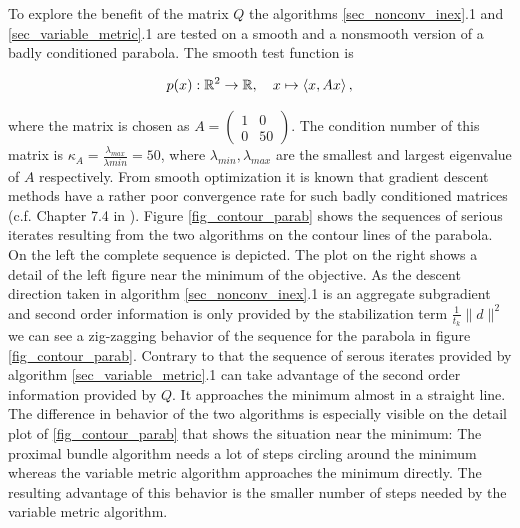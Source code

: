To explore the benefit of the matrix \(Q\) the algorithms \ref{sec_nonconv_inex}.1 and \ref{sec_variable_metric}.1 are tested on a smooth and a nonsmooth version of a badly conditioned parabola.
The smooth test function is

\[p(x): \mathbb{R}^2 \to \mathbb{R}, \quad x \mapsto \left\langle x, Ax \right\rangle,\]

where the matrix is chosen as \(A = \begin{pmatrix} 1&0 \\ 0&50\end{pmatrix}\). The condition number of this matrix is \(\kappa_A = \frac{\lambda_{max}}{\lambda{min}} = 50\), where \(\lambda_{min}, \lambda_{max}\) are the smallest and largest eigenvalue of \(A\) respectively. From smooth optimization it is known that gradient descent methods have a rather poor convergence rate for such badly conditioned matrices (c.f. Chapter 7.4 in \cite{Ulbrich2012}).
Figure \ref{fig_contour_parab} shows the sequences of serious iterates resulting from the two algorithms on the contour lines of the parabola. On the left the complete sequence is depicted. The plot on the right shows a detail of the left figure near the minimum of the objective.
As the descent direction taken in algorithm \ref{sec_nonconv_inex}.1 is an aggregate subgradient and second order information is only provided by the stabilization term \(\frac{1}{t_k}\|d\|^2\) we can see a zig-zagging behavior of the sequence for the parabola in figure \ref{fig_contour_parab}.
Contrary to that the sequence of serous iterates provided by algorithm \ref{sec_variable_metric}.1 can take advantage of the second order information provided by \(Q\).
It approaches the minimum almost in a straight line. The difference in behavior of the two algorithms is especially visible on the detail plot of \ref{fig_contour_parab} that shows the situation near the minimum: The proximal bundle algorithm needs a lot of steps circling around the minimum whereas the variable metric algorithm approaches the minimum directly. The resulting advantage of this behavior is the smaller number of steps needed by the variable metric algorithm. 



